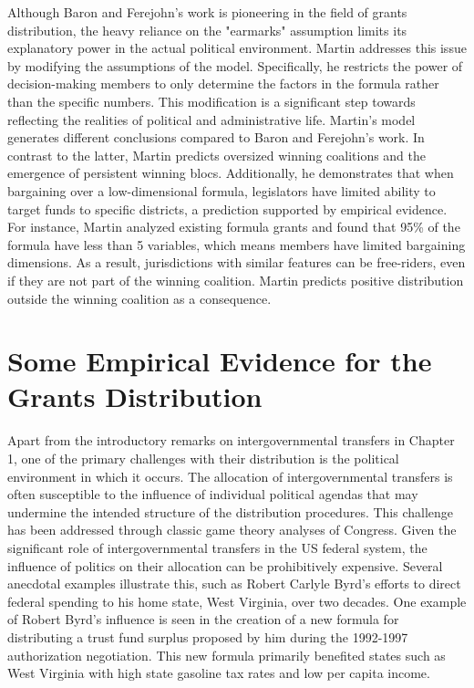 Although Baron and Ferejohn's work \cite{baron1989bargaining} is pioneering in the field of grants distribution, the heavy reliance on the "earmarks" assumption limits its explanatory power in the actual political environment. Martin \cite{martin2018dividing} addresses this issue by modifying the assumptions of the model. Specifically, he restricts the power of decision-making members to only determine the factors in the formula rather than the specific numbers. This modification is a significant step towards reflecting the realities of political and administrative life. Martin's model generates different conclusions compared to Baron and Ferejohn's work. In contrast to the latter, Martin predicts oversized winning coalitions and the emergence of persistent winning blocs. Additionally, he demonstrates that when bargaining over a low-dimensional formula, legislators have limited ability to target funds to specific districts, a prediction supported by empirical evidence. For instance, Martin analyzed existing formula grants and found that 95\% of the formula have less than 5 variables, which means members have limited bargaining dimensions. As a result, jurisdictions with similar features can be free-riders, even if they are not part of the winning coalition. Martin predicts positive distribution outside the winning coalition as a consequence.

\section{Some Empirical Evidence for the Grants Distribution}

Apart from the introductory remarks on intergovernmental transfers in Chapter 1, one of the primary challenges with their distribution is the political environment in which it occurs. The allocation of intergovernmental transfers is often susceptible to the influence of individual political agendas that may undermine the intended structure of the distribution procedures. This challenge has been addressed through classic game theory analyses of Congress. Given the significant role of intergovernmental transfers in the US federal system, the influence of politics on their allocation can be prohibitively expensive. Several anecdotal examples illustrate this, such as Robert Carlyle Byrd's efforts to direct federal spending to his home state, West Virginia, over two decades. One example of Robert Byrd's influence is seen in the creation of a new formula for distributing a trust fund surplus proposed by him during the 1992-1997 authorization negotiation. This new formula primarily benefited states such as West Virginia with high state gasoline tax rates and low per capita income.


